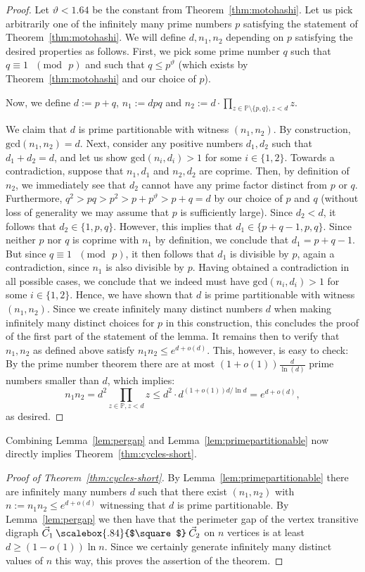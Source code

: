 \documentclass[english,11pt]{article}
\theoremstyle{definition}
\numberwithin{equation}{section}
\numberwithin{figure}{section}
\newcommand\car{\mathbin{\text{\scalebox{.84}{$\square$}}}}
\begin{document}
\begin{proof}
Let $\vartheta<1.64$ be the constant from Theorem~\ref{thm:motohashi}. Let us pick arbitrarily one of the infinitely many prime numbers $p$ satisfying the statement of Theorem~\ref{thm:motohashi}. We will define $d, n_1, n_2$ depending on $p$ satisfying the desired properties as follows. First, we pick some prime number $q$ such that $q\equiv 1 \text{ }(\mathrm{mod}\text{ }p)$ and such that $q\le p^\vartheta$ (which exists by Theorem~\ref{thm:motohashi} and our choice of $p$). 

Now, we define $d:=p+q$, $n_1:=dpq$ and $n_2:=d\cdot \prod_{z\in \mathbb{P}\setminus \{p,q\}, z<d}z$. 

We claim that $d$ is prime partitionable with witness $(n_1,n_2)$. By construction, $\mathrm{gcd}(n_1,n_2)=d$. Next, consider any positive numbers $d_1, d_2$ such that $d_1+d_2=d$, and let us show $\mathrm{gcd}(n_i,d_i)>1$ for some $i\in \{1,2\}$. Towards a contradiction, suppose that $n_1, d_1$ and $n_2, d_2$ are coprime. Then, by definition of $n_2$, we immediately see that $d_2$ cannot have any prime factor distinct from $p$ or $q$. Furthermore, $q^2>pq>p^2>p+p^\vartheta>p+q=d$ by our choice of $p$ and $q$ (without loss of generality we may assume that $p$ is sufficiently large). Since $d_2<d$, it follows that $d_2\in \{1,p,q\}$. However, this implies that $d_1\in \{p+q-1,p,q\}$. Since neither $p$ nor $q$ is coprime with $n_1$ by definition, we conclude that $d_1=p+q-1$. But since $q\equiv 1 \text{ }(\mathrm{mod}\text{ }p)$, it then follows that $d_1$ is divisible by $p$, again a contradiction, since $n_1$ is also divisible by $p$. Having obtained a contradiction in all possible cases, we conclude that we indeed must have $\mathrm{gcd}(n_i,d_i)>1$ for some $i\in \{1,2\}$. Hence, we have shown that $d$ is prime partitionable with witness $(n_1,n_2)$. Since we create infinitely many distinct numbers $d$ when making infinitely many distinct choices for $p$ in this construction, this concludes the proof of the first part of the statement of the lemma. It remains then to verify that $n_1, n_2$ as defined above satisfy $n_1n_2\le e^{d+o(d)}$. This, however, is easy to check: By the prime number theorem there are at most $(1+o(1))\frac{d}{\ln(d)}$ prime numbers smaller than $d$, which implies:
$$n_1n_2=d^2\prod_{z\in \mathbb{P}, z<d}z\le d^2\cdot d^{(1+o(1))d/\ln d}=e^{d+o(d)},$$ as desired.
\end{proof}

Combining Lemma~\ref{lem:pergap} and Lemma~\ref{lem:primepartitionable} now directly implies Theorem~\ref{thm:cycles-short}.
\begin{proof}[Proof of Theorem~\ref{thm:cycles-short}]
By Lemma~\ref{lem:primepartitionable} there are infinitely many numbers $d$ such that there exist $(n_1,n_2)$ with $n:=n_1n_2\le e^{d+o(d)}$ witnessing that $d$ is prime partitionable. By Lemma~\ref{lem:pergap} we then have that the perimeter gap of the vertex transitive digraph $\vec{C}_1\car\vec{C}_2$ on $n$ vertices is at least $d\ge (1-o(1))\ln n$. Since we certainly generate infinitely many distinct values of $n$ this way, this proves the assertion of the theorem.
\end{proof}
\end{document}
